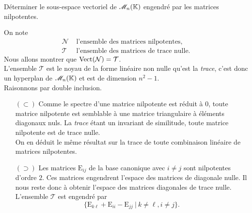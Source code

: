 \begin{exercice}
    Déterminer le sous-espace vectoriel de $\mathscr{M}_n(\mathbb{K})$ engendré par les matrices nilpotentes.
\end{exercice}

\begin{solution}
    On note 
    \begin{align*}
        \mathcal{N} & \text{ l'ensemble des matrices nilpotentes}, \\
        \mathcal{T} & \text{ l'ensemble des matrices de trace nulle.}
    \end{align*}
    Nous allons montrer que $\mathrm{Vect}(\mathcal{N}) = \mathcal{T}$. \\
    L'ensemble $\mathcal{T}$ est le noyau de la forme linéaire non nulle qu'est la \emph{trace}, c'est donc un hyperplan de $\mathscr{M}_n(\mathbb{K})$ et est de dimension $n^2-1$. \\
    Raisonnons par double inclusion.
    \begin{itemize}
        \item[$(\subset)$] Comme le spectre d'une matrice nilpotente est réduit à $0$, toute matrice nilpotente est semblable à une matrice triangulaire à éléments diagonaux nuls. La \emph{trace} étant un invariant de similitude, toute matrice nilpotente est de trace nulle. \\
        On en déduit le même résultat sur la trace de toute combinaison linéaire de matrices nilpotentes.
        \item[$(\supset)$] Les matrices $\mathrm{E}_{ij}$ de la base canonique avec $i \not= j$ sont nilpotentes d'ordre $2$. Ces matrices engendrent l'espace des matrices de diagonale nulle. Il nous reste donc à obtenir l'espace des matrices diagonales de trace nulle. L'ensemble $\mathcal{T}$ est engendré par
        $$\big\{ \mathrm{E}_{k \ell} + \mathrm{E}_{ii} - \mathrm{E}_{jj}\ |\ k \not= \ell, i \not= j \big\}.$$

\end{itemize}
\end{solution}
